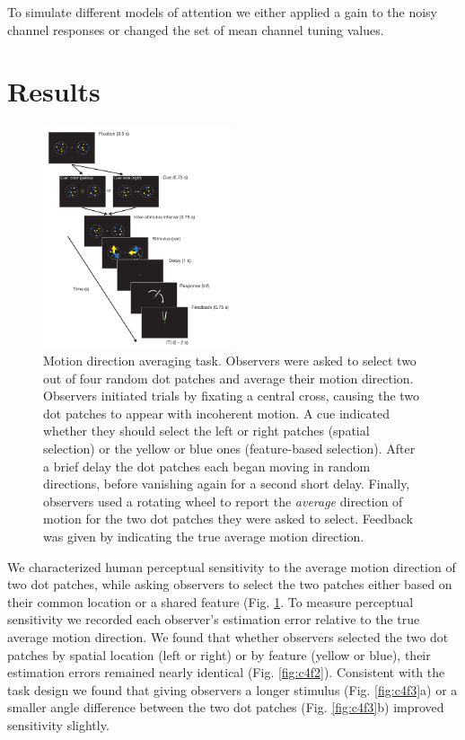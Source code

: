 To simulate different models of attention we either applied a gain to the noisy channel responses or changed the set of mean channel tuning values. 

\section{Results}

\begin{figure}
\centering
\includegraphics[keepaspectratio,width=0.5\textwidth]{figs_c4/f1_task.pdf}
\caption[Averaging task]{Motion direction averaging task. Observers were asked to select two out of four random dot patches and average their motion direction. Observers initiated trials by fixating a central cross, causing the two dot patches to appear with incoherent motion. A cue indicated whether they should select the left or right patches (spatial selection) or the yellow or blue ones (feature-based selection). After a brief delay the dot patches each began moving in random directions, before vanishing again for a second short delay. Finally, observers used a rotating wheel to report the \textit{average} direction of motion for the two dot patches they were asked to select. Feedback was given by indicating the true average motion direction.}
\label{fig:c4f1}
\end{figure}

We characterized human perceptual sensitivity to the average motion direction of two dot patches, while asking observers to select the two patches either based on their common location or a shared feature (Fig. \ref{fig:c4f1}. To measure perceptual sensitivity we recorded each observer's estimation error relative to the true average motion direction. We found that whether observers selected the two dot patches by spatial location (left or right) or by feature (yellow or blue), their estimation errors remained nearly identical (Fig. \ref{fig:c4f2}). Consistent with the task design we found that giving observers a longer stimulus (Fig. \ref{fig:c4f3}a) or a smaller angle difference between the two dot patches (Fig. \ref{fig:c4f3}b) improved sensitivity slightly. 

